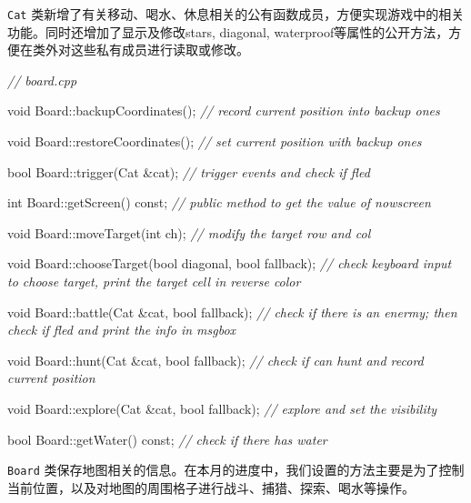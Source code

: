 \documentclass[hyperref,UTF8,a4paper]{ctexart}
\newenvironment{Shaded}{}{}
\newcommand{\AttributeTok}[1]{\textcolor[rgb]{0.49,0.56,0.16}{#1}}
\newcommand{\CommentTok}[1]{\textcolor[rgb]{0.38,0.63,0.69}{\textit{#1}}}
\newcommand{\DataTypeTok}[1]{\textcolor[rgb]{0.56,0.13,0.00}{#1}}
\newcommand{\NormalTok}[1]{#1}
\begin{document}
\texttt{Cat}
类新增了有关移动、喝水、休息相关的公有函数成员，方便实现游戏中的相关功能。同时还增加了显示及修改stars,
diagonal,
waterproof等属性的公开方法，方便在类外对这些私有成员进行读取或修改。

\begin{Shaded}
\begin{Highlighting}[]
\CommentTok{// board.cpp}

\DataTypeTok{void}\NormalTok{ Board::backupCoordinates();}
\CommentTok{// record current position into backup ones}

\DataTypeTok{void}\NormalTok{ Board::restoreCoordinates();}
\CommentTok{// set current position with backup ones}

\DataTypeTok{bool}\NormalTok{ Board::trigger(Cat &cat);}
\CommentTok{// trigger events and check if fled}

\DataTypeTok{int}\NormalTok{ Board::getScreen() }\AttributeTok{const}\NormalTok{;}
\CommentTok{// public method to get the value of nowscreen}

\DataTypeTok{void}\NormalTok{ Board::moveTarget(}\DataTypeTok{int}\NormalTok{ ch);}
\CommentTok{// modify the target row and col}

\DataTypeTok{void}\NormalTok{ Board::chooseTarget(}\DataTypeTok{bool}\NormalTok{ diagonal, }\DataTypeTok{bool}\NormalTok{ fallback);}
\CommentTok{// check keyboard input to choose target, print the target cell in reverse color}

\DataTypeTok{void}\NormalTok{ Board::battle(Cat &cat, }\DataTypeTok{bool}\NormalTok{ fallback);}
\CommentTok{// check if there is an enermy; then check if fled and print the info in msgbox}

\DataTypeTok{void}\NormalTok{ Board::hunt(Cat &cat, }\DataTypeTok{bool}\NormalTok{ fallback);}
\CommentTok{// check if can hunt and record current position}

\DataTypeTok{void}\NormalTok{ Board::explore(Cat &cat, }\DataTypeTok{bool}\NormalTok{ fallback);}
\CommentTok{// explore and set the visibility}

\DataTypeTok{bool}\NormalTok{ Board::getWater() }\AttributeTok{const}\NormalTok{;}
\CommentTok{// check if there has water}
\end{Highlighting}
\end{Shaded}

\texttt{Board}
类保存地图相关的信息。在本月的进度中，我们设置的方法主要是为了控制当前位置，以及对地图的周围格子进行战斗、捕猎、探索、喝水等操作。
\end{document}
